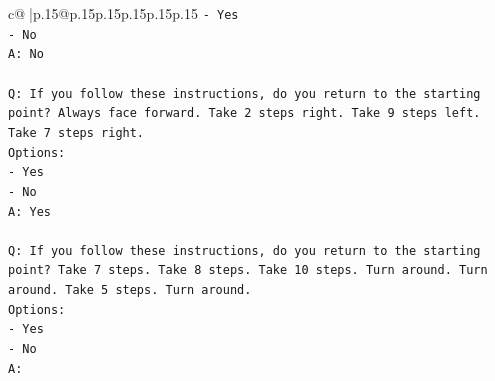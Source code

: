 \documentclass{article}
\begin{document}
{\begin{supertabular}{c@{$\;$}|p{.15\linewidth}@{}p{.15\linewidth}p{.15\linewidth}p{.15\linewidth}p{.15\linewidth}p{.15\linewidth}}
{{{\texttt{{-} Yes} \\
\texttt{{-} No} \\
\texttt{A: No} \\
\\ 
\texttt{Q: If you follow these instructions, do you return to the starting point? Always face forward. Take 2 steps right. Take 9 steps left. Take 7 steps right.} \\
\texttt{Options:} \\
\texttt{{-} Yes} \\
\texttt{{-} No} \\
\texttt{A: Yes} \\
\\ 
\texttt{Q: If you follow these instructions, do you return to the starting point? Take 7 steps. Take 8 steps. Take 10 steps. Turn around. Turn around. Take 5 steps. Turn around.} \\
\texttt{Options:} \\
\texttt{{-} Yes} \\
\texttt{{-} No} \\
\texttt{A:} \\
            }
        }
    }
     \\ \\


\end{supertabular}}
\end{document}
